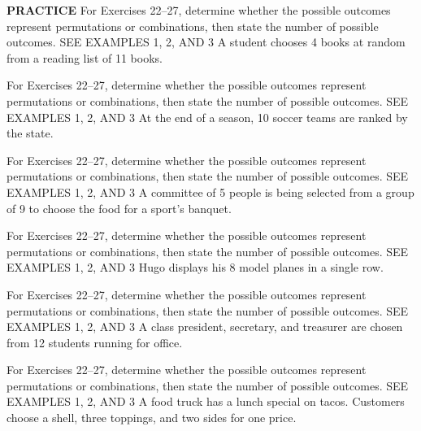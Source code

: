 \documentclass{article}
\newenvironment{practice}[2]{}{}        %
\newcommand{\answer}[1]{}               %
\newcommand{\placeholder}[2]{}          %
\begin{document}
\begin{practice}{22}{1}
\textbf{PRACTICE} For Exercises 22--27, determine whether the possible outcomes represent permutations or combinations, then state the number of possible outcomes. SEE EXAMPLES 1, 2, AND 3
A student chooses 4 books at random from a reading list of 11 books.
\answer{combination; 330}
\end{practice}
\begin{practice}{23}{1}
For Exercises 22--27, determine whether the possible outcomes represent permutations or combinations, then state the number of possible outcomes. SEE EXAMPLES 1, 2, AND 3
At the end of a season, 10 soccer teams are ranked by the state.
\answer{permutation; 3,628,800}
\end{practice}
\begin{practice}{24}{1}
For Exercises 22--27, determine whether the possible outcomes represent permutations or combinations, then state the number of possible outcomes. SEE EXAMPLES 1, 2, AND 3
A committee of 5 people is being selected from a group of 9 to choose the food for a sport's banquet.
\answer{combination; 126}
\end{practice}
\begin{practice}{25}{1}
For Exercises 22--27, determine whether the possible outcomes represent permutations or combinations, then state the number of possible outcomes. SEE EXAMPLES 1, 2, AND 3
Hugo displays his 8 model planes in a single row.
\answer{permutation; 40,320}
\end{practice}
\begin{practice}{26}{1}
For Exercises 22--27, determine whether the possible outcomes represent permutations or combinations, then state the number of possible outcomes. SEE EXAMPLES 1, 2, AND 3
A class president, secretary, and treasurer are chosen from 12 students running for office.
\answer{permutation; 1,320}
\end{practice}
\begin{practice}{27}{1}
For Exercises 22--27, determine whether the possible outcomes represent permutations or combinations, then state the number of possible outcomes. SEE EXAMPLES 1, 2, AND 3
A food truck has a lunch special on tacos. Customers choose a shell, three toppings, and two sides for one price.
\placeholder{illustration}{Orange and green taco truck with yellow Menu. Shell: Hard, Soft, Wheat. Toppings: Ground Beef, Pollo, Steak, Cheese, Lettuce, Tomato, Sour Cream. Sides: Fountain Drink, Rice, Beans, Fruit.}
\answer{combination(s); 630}
\end{practice}
\end{document}
